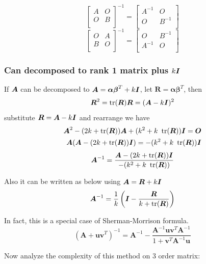 \documentclass{overview}
\begin{document}
\[
\begin{bmatrix}
	A & O \\
	O & B \\
\end{bmatrix}^{-1}
=
\begin{bmatrix}
	A^{-1} & O \\
	O & B^{-1} \\
\end{bmatrix}
\] 
\[
\begin{bmatrix}
	O & A \\
	B & O \\
\end{bmatrix}^{-1}
=
\begin{bmatrix}
	O & B^{-1} \\
	A^{-1} & O \\
\end{bmatrix}
\] 

\subsubsection{Can decomposed to rank 1 matrix plus $k\boldsymbol{I}$}

If $\boldsymbol{A}$ can be decomposed to $\boldsymbol{A}=\boldsymbol\alpha \boldsymbol\beta^T + k\boldsymbol{I}$,
let $\boldsymbol{R}=\boldsymbol{\alpha} \boldsymbol{\beta}^T$, then
\[
	\boldsymbol{R}^2=\operatorname{tr}(\boldsymbol{R})\boldsymbol{R}=
	(\boldsymbol{A}-k\boldsymbol{I})^2
\] 
substitute $\boldsymbol{R}=\boldsymbol{A}-k\boldsymbol{I}$ and rearrange we have
\[
	\begin{aligned}
	\A^2 - (2k+\tr(\boldsymbol{R}))\A + (k^2 + k\ \tr(\boldsymbol{R}))\I = \boldsymbol{O} \\
	\A(\A - (2k+\tr(\boldsymbol{R}))\I) = -(k^2 + k\ \tr(\boldsymbol{R}))\I \\
	\end{aligned}
\] 
\[
	\boldsymbol{A}^{-1} = \frac{
		\boldsymbol{A} - (2k+\operatorname{tr}(\boldsymbol{R}))\boldsymbol{I}
	}{
		-(k^2 + k\ \operatorname{tr}(\boldsymbol{R}))
	}
\] 

Also it can be written as below using $ \boldsymbol{A}=\boldsymbol{R} + k\boldsymbol{I} $
\[
	\boldsymbol{A}^{-1} = \frac{1}{k}\left(\boldsymbol{I}-\frac{\boldsymbol{R}}{k+\operatorname{tr}(\boldsymbol{R})}\right)
\] 

In fact, this is a special case of Sherman-Morrison formula.
\[
	(\boldsymbol{A} + \boldsymbol{u}\boldsymbol{v}^T)^{-1} =
	\boldsymbol{A}^{-1} -
	\frac{
		\boldsymbol{A}^{-1}\boldsymbol{u}\boldsymbol{v}^T\boldsymbol{A}^{-1}
	}{
		1 + \boldsymbol{v}^T\boldsymbol{A}^{-1}\boldsymbol{u}
	}
\] 

Now analyze the complexity of this method on 3 order matrix:
\end{document}
